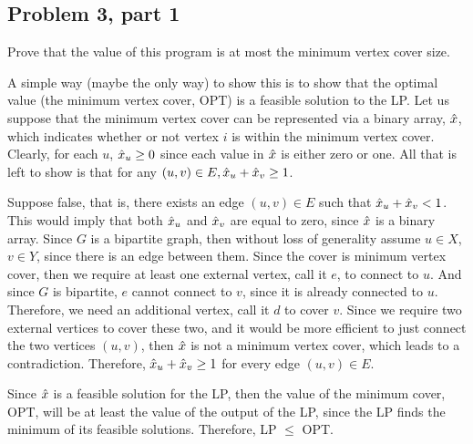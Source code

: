 \subsection{Problem 3, part 1}
Prove that the value of this program is at most the minimum vertex cover size.
\partbreak
\begin{solution}

    A simple way (maybe the only way) to show this is to show that the optimal value (the minimum vertex cover, OPT) is a feasible solution to the LP. Let us suppose that the minimum vertex cover can be represented via a binary array, $\hat{x}$, which indicates whether or not vertex $i$ is within the minimum vertex cover. Clearly, for each $u$, $\hat{x}_u \geq 0$ since each value in $\hat{x}$ is either zero or one. All that is left to show is that for any $(u, v) \in E, \hat{x}_u + \hat{x}_v \geq 1$.  \par

    \hop
    Suppose false, that is, there exists an edge $(u, v) \in E$ such that $\hat{x}_u + \hat{x}_v < 1$. This would imply that both $\hat{x}_u$ and $\hat{x}_v$ are equal to zero, since $\hat{x}$ is a binary array. Since $G$ is a bipartite graph, then without loss of generality assume $u \in X$, $v \in Y$, since there is an edge between them. Since the cover is minimum vertex cover, then we require at least one external vertex, call it $e$, to connect to $u$. And since $G$ is bipartite, $e$ cannot connect to $v$, since it is already connected to $u$. Therefore, we need an additional vertex, call it $d$ to cover $v$. Since we require two external vertices to cover these two, and it would be more efficient to just connect the two vertices $(u, v)$, then $\hat{x}$ is not a minimum vertex cover, which leads to a contradiction. Therefore, $\hat{x}_u + \hat{x}_v \geq 1$ for every edge $(u, v) \in E$. \par

    \hop
    Since $\hat{x}$ is a feasible solution for the LP, then the value of the minimum cover, OPT, will be at least the value of the output of the LP, since the LP finds the minimum of its feasible solutions. Therefore, LP $\leq$ OPT.
    
\end{solution}

\newpage
